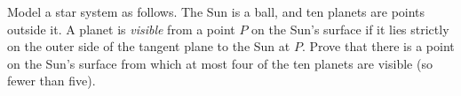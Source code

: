 Model a star system as follows. The Sun is a ball, and ten planets are points outside it. A planet is \emph{visible} from a point $P$ on the Sun's surface if it lies strictly on the outer side of the tangent plane to the Sun at $P$. Prove that there is a point on the Sun's surface from which at most four of the ten planets are visible (so fewer than five).
